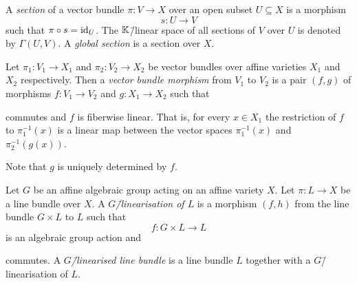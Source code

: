\begin{defi}
	A \emph{section} of a vector bundle $\pi\colon V \rightarrow X$ over an open subset $U\subseteq X$ is a morphism
	$$s\colon U \longrightarrow V$$
	such that $\pi \circ s = \text{id}_U$. The $\mathbb{K}$\=/linear space of all sections of $V$ over $U$ is denoted by $\Gamma(U,V)$. A \emph{global section} is a section over $X$.
\end{defi}

\begin{defi}
	Let $\pi_1\colon V_1 \rightarrow X_1$ and $\pi_2\colon V_2 \rightarrow X_2$ be vector bundles over affine varieties $X_1$ and $X_2$ respectively. Then a \emph{vector bundle morphism} from $V_1$ to $V_2$ is a pair $(f,g)$ of morphisms $f\colon V_1 \rightarrow V_2$ and $g\colon X_1 \rightarrow X_2$ such that
	\begin{center}
	\end{center}
	commutes and $f$ is fiberwise linear. That is, for every $x\in X_1$ the restriction of $f$ to $\pi_1^{-1}(x)$ is a linear map between the vector spaces $\pi_1^{-1}(x)$ and $\pi_2^{-1}(g(x))$.
	
	Note that $g$ is uniquely determined by $f$.
\end{defi}

\begin{defi}[$G$\=/linearisation, \phantom{}{\cite[chapter 1.3]{git}}]
	Let $G$ be an affine algebraic group acting on an affine variety $X$. Let $\pi\colon L \rightarrow X$ be a line bundle over $X$. A \emph{$G$\=/linearisation of $L$} is a morphism $(f,h)$ from the line bundle $G\times L$ to $L$ such that
	$$f\colon G\times L \longrightarrow L$$
	is an algebraic group action and
	\begin{center}
	\end{center}
	commutes. A \emph{$G$\=/linearised line bundle} is a line bundle $L$ together with a  $G$\=/linearisation of $L$.
\end{defi}

